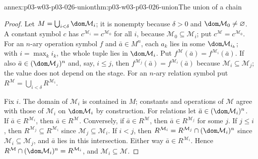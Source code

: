 \begin{annexitem}{annex:p03-w03-p03-026-union}{thm:p03-w03-p03-026-union}{The union of a chain}
\begin{proof}
Let \(M=\bigcup_{i<\delta}\dom\mathcal M_i\); it is nonempty because
\(\delta>0\) and \(\dom\mathcal M_0\neq\varnothing\).  A constant symbol
\(c\) has \(c^{\mathcal M_i}=c^{\mathcal M_0}\) for all \(i\), because
\(\mathcal M_0\subseteq\mathcal M_i\); put \(c^{\mathcal M}=c^{\mathcal M_0}\).
For an \(n\)-ary operation symbol \(f\) and \(\bar a\in M^n\), each
\(a_k\) lies in some \(\dom\mathcal M_{i_k}\); with \(i=\max_k i_k\), the
whole tuple lies in \(\dom\mathcal M_i\).  Put
\(f^{\mathcal M}(\bar a)=f^{\mathcal M_i}(\bar a)\).  If also
\(\bar a\in(\dom\mathcal M_j)^n\) and, say, \(i\le j\), then
\(f^{\mathcal M_j}(\bar a)=f^{\mathcal M_i}(\bar a)\) because
\(\mathcal M_i\subseteq\mathcal M_j\); the value does not depend on the
stage.  For an \(n\)-ary relation symbol put
\(R^{\mathcal M}=\bigcup_{i<\delta}R^{\mathcal M_i}\).

Fix \(i\).  The domain of \(\mathcal M_i\) is contained in \(M\);
constants and operations of \(\mathcal M\) agree with those of
\(\mathcal M_i\) on \(\dom\mathcal M_i\) by construction.  For relations let
\(\bar a\in(\dom\mathcal M_i)^n\).  If \(\bar a\in R^{\mathcal M_i}\), then
\(\bar a\in R^{\mathcal M}\).  Conversely, if \(\bar a\in R^{\mathcal M}\),
then \(\bar a\in R^{\mathcal M_j}\) for some \(j\).  If \(j\le i\), then
\(R^{\mathcal M_j}\subseteq R^{\mathcal M_i}\) since
\(\mathcal M_j\subseteq\mathcal M_i\).  If \(i<j\), then
\(R^{\mathcal M_i}=R^{\mathcal M_j}\cap(\dom\mathcal M_i)^n\) since
\(\mathcal M_i\subseteq\mathcal M_j\), and \(\bar a\) lies in this
intersection.  Either way \(\bar a\in R^{\mathcal M_i}\).  Hence
\(R^{\mathcal M}\cap(\dom\mathcal M_i)^n=R^{\mathcal M_i}\), and
\(\mathcal M_i\subseteq\mathcal M\).
\end{proof}
\end{annexitem}

